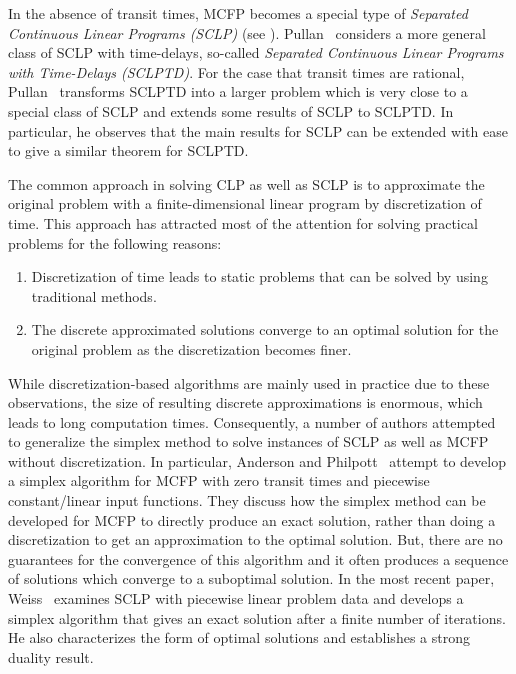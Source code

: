 \documentclass{svjour3}                     \smartqed
\begin{document}
In the absence of transit times, MCFP becomes a special type of {\em Separated Continuous Linear Programs (SCLP)} (see \cite{Anderson78}). Pullan~\cite{Pullan97} considers a more general class of SCLP with time-delays, so-called {\em Separated Continuous
Linear Programs with Time-Delays (SCLPTD)}.  For the case that transit times are rational, Pullan~\cite{Pullan97} transforms SCLPTD into a larger
problem which is very close to a special class of SCLP and
extends some results of SCLP to SCLPTD. In particular, he observes that the main results for SCLP can be extended with ease to give a similar theorem for SCLPTD. 

The common approach in solving CLP as well as SCLP is to approximate the original problem with a finite-dimensional linear program by discretization of time. This approach has attracted most of the attention for solving practical problems for the following reasons:
\begin{enumerate}
\item Discretization of time leads to static problems that can be solved by using traditional methods.\item The discrete approximated solutions converge to an optimal solution for the original problem as the discretization becomes finer.
\end{enumerate}




While discretization-based algorithms are mainly used in practice due to these observations, the size of resulting discrete approximations is enormous, which leads to long computation times. Consequently, a number of authors attempted to generalize the simplex method to solve instances of SCLP as well as MCFP without discretization. In particular, Anderson and Philpott~\cite{AndersonPhilpott89} attempt to develop a simplex algorithm for MCFP with zero transit times and piecewise constant/linear input functions. They discuss how the simplex method can be developed for MCFP to directly produce an exact solution, rather than doing a discretization to get an approximation to the optimal solution. But, there are no guarantees for the convergence of this algorithm and it often produces a sequence of solutions which converge to a suboptimal solution. In the most recent paper, Weiss~\cite{Weiss08} examines SCLP with piecewise linear problem data and develops a simplex algorithm that gives an exact solution after a finite number of iterations. He also characterizes the form of optimal solutions and establishes a strong duality result.
\end{document}
